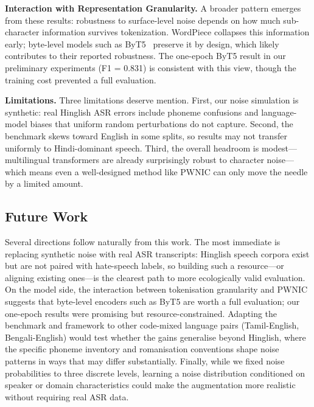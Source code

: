 \documentclass[conference]{IEEEtran}
\begin{document}
\textbf{Interaction with Representation Granularity.}
A broader pattern emerges from these results: robustness to surface-level noise depends on how much sub-character information survives tokenization. WordPiece collapses this information early; byte-level models such as ByT5~\cite{xue2022byt5} preserve it by design, which likely contributes to their reported robustness. The one-epoch ByT5 result in our preliminary experiments (F1 = 0.831) is consistent with this view, though the training cost prevented a full evaluation.

\textbf{Limitations.}
Three limitations deserve mention. First, our noise simulation is synthetic: real Hinglish ASR errors include phoneme confusions and language-model biases that uniform random perturbations do not capture. Second, the benchmark skews toward English in some splits, so results may not transfer uniformly to Hindi-dominant speech. Third, the overall headroom is modest---multilingual transformers are already surprisingly robust to character noise---which means even a well-designed method like PWNIC can only move the needle by a limited amount.

\subsection{Future Work}

Several directions follow naturally from this work. The most immediate is replacing synthetic noise with real ASR transcripts: Hinglish speech corpora exist but are not paired with hate-speech labels, so building such a resource---or aligning existing ones---is the clearest path to more ecologically valid evaluation. On the model side, the interaction between tokenisation granularity and PWNIC suggests that byte-level encoders such as ByT5 are worth a full evaluation; our one-epoch results were promising but resource-constrained. Adapting the benchmark and framework to other code-mixed language pairs (Tamil-English, Bengali-English) would test whether the gains generalise beyond Hinglish, where the specific phoneme inventory and romanisation conventions shape noise patterns in ways that may differ substantially. Finally, while we fixed noise probabilities to three discrete levels, learning a noise distribution conditioned on speaker or domain characteristics could make the augmentation more realistic without requiring real ASR data.
\end{document}

